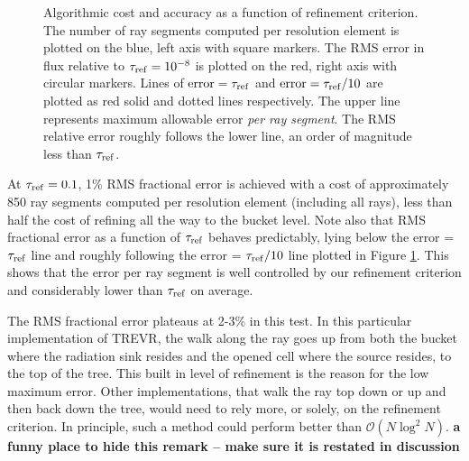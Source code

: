 \documentclass[fleq,usenatbib]{mnras}
\newcommand{\acro}{TREVR}
\newcommand{\bigO}[1]{\mathcal{O}\left(#1\right)}
\newcommand{\comment}[1]{\textbf{\color{red}#1}}
\newcommand{\tr}{\tau_{\rm ref}}
\begin{document}
{\begin{figure}
\caption{Algorithmic cost and accuracy as a function of refinement criterion. 
The number of ray segments computed per resolution element is plotted on the 
blue, left axis with square markers. The RMS error in flux relative to $\tr
=10^{-8}$ is plotted on the red, right axis with circular markers. Lines of 
${\rm error} = \tr$ and ${\rm error} = \tr/10$ are plotted as red solid and dotted 
lines respectively. The upper line represents maximum allowable error 
\textit{per ray segment}. The RMS relative error roughly follows the lower 
line, an order of magnitude less than $\tr$.}
\label{fig:refcrit}
\end{figure}

At $\tr=0.1$, 1\% RMS fractional error is achieved with a cost of 
approximately 850 ray segments computed per resolution element (including all rays), less than half 
the cost of refining all the way to the bucket level. Note also that RMS 
fractional error as a function of $\tr$ behaves predictably, lying below the 
error = $\tr$ line and roughly following the error = $\tr/10$ line plotted in 
Figure \ref{fig:refcrit}. This shows that the error per ray segment is well
controlled by our refinement criterion and considerably lower than $\tr$ on average.

The RMS fractional error plateaus at 2-3\% in this test. In this particular 
implementation of \acro{}, the walk along the ray goes up from both the bucket 
where the radiation sink resides and the opened cell where the source resides, 
to the top of the tree. This built in level of refinement is the reason for 
the low maximum error. Other implementations, that walk the ray top down or up 
and then back down the tree, would need to rely more, or solely, on the 
refinement criterion. In principle, such a method could perform better than 
$\bigO{N\log^2 N}$.
\comment{a funny place to hide this remark -- make sure it is restated in discussion}

}
\end{document}
